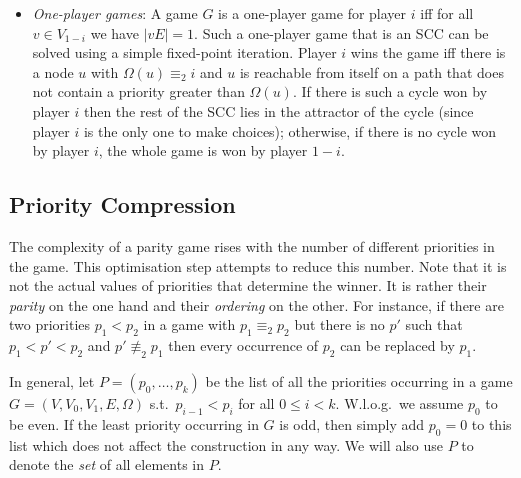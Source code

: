 \begin{itemize}
\item \emph{One-player games}: A game $G$ is a one-player game for player $i$ iff for all $v \in V_{1 - i}$ we have
$|vE| = 1$. Such a one-player game that is an SCC can be solved using a simple fixed-point iteration. 
Player $i$ wins the game iff there is a node $u$ with $\Omega(u) \equiv_2 i$ and $u$ is reachable from itself
on a path that does not contain a priority greater than $\Omega(u)$.
If there is such a cycle won by player $i$ then the rest of the SCC lies in the attractor of the cycle (since 
player $i$ is the only one to make choices); otherwise, if there is no cycle won by player $i$, the whole game 
is won by player $1-i$.
\end{itemize}


\subsection{Priority Compression}

The complexity of a parity game rises with the number of different priorities in the game. This optimisation step
attempts to reduce this number. Note that it is not the actual values of priorities that determine the winner.
It is rather their \emph{parity} on the one hand and their \emph{ordering} on the other. For instance, if there are 
two priorities $p_1 < p_2$ in a game with $p_1 \equiv_2 p_2$ but there is no $p'$ such that $p_1 < p' < p_2$ and 
$p' \not\equiv_2 p_1$ then every occurrence of $p_2$ can be replaced by $p_1$. 

In general, let $P = (p_0,\ldots,p_k)$ be the list of all the priorities occurring in a game $G = (V,V_0,V_1,E,\Omega)$ 
s.t.\ $p_{i-1} < p_i$ for all $0 \le i < k$. W.l.o.g.\ we assume $p_0$ to be even. If the least priority occurring in
$G$ is odd, then simply add $p_0 = 0$ to this list which does not affect the construction in any way. We will also
use $P$ to denote the \emph{set} of all elements in $P$.

